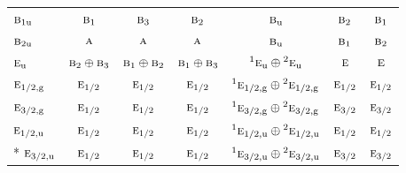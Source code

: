 \documentclass[10pt,a4paper]{article}
\numberwithin{equation}{section}
\newcommand{\irr}[1]{\text{\normalfont\scshape #1}}
\newcommand{\conjpair}[1]{{}^{#1}}
\newcommand{\ptag}[1]{\mathrm{#1}}
\begin{document}
{\begin{longtable}{@{}lcccccc@{}}
$\irr{b}_{1\ptag{u}}$ & $\irr{b}_{1}$ & $\irr{b}_{3}$ & $\irr{b}_{2}$ & $\irr{b}_{\ptag{u}}$ & $\irr{b}_{2}$ & $\irr{b}_{1}$\\
$\irr{b}_{2\ptag{u}}$ & $\irr{a}$ & $\irr{a}$ & $\irr{a}$ & $\irr{b}_{\ptag{u}}$ & $\irr{b}_{1}$ & $\irr{b}_{2}$\\
$\irr{e}_{\ptag{u}}$ & $\irr{b}_{2}\oplus \irr{b}_{3}$ & $\irr{b}_{1}\oplus \irr{b}_{2}$ & $\irr{b}_{1}\oplus \irr{b}_{3}$ & $\conjpair{1}\irr{e}_{\ptag{u}}\oplus \conjpair{2}\irr{e}_{\ptag{u}}$ & $\irr{e}$ & $\irr{e}$\\
$\irr{e}_{1/2,\ptag{g}}$ & $\irr{e}_{1/2}$ & $\irr{e}_{1/2}$ & $\irr{e}_{1/2}$ & $\conjpair{1}\irr{e}_{1/2,\ptag{g}}\oplus \conjpair{2}\irr{e}_{1/2,\ptag{g}}$ & $\irr{e}_{1/2}$ & $\irr{e}_{1/2}$\\
$\irr{e}_{3/2,\ptag{g}}$ & $\irr{e}_{1/2}$ & $\irr{e}_{1/2}$ & $\irr{e}_{1/2}$ & $\conjpair{1}\irr{e}_{3/2,\ptag{g}}\oplus \conjpair{2}\irr{e}_{3/2,\ptag{g}}$ & $\irr{e}_{3/2}$ & $\irr{e}_{3/2}$\\
$\irr{e}_{1/2,\ptag{u}}$ & $\irr{e}_{1/2}$ & $\irr{e}_{1/2}$ & $\irr{e}_{1/2}$ & $\conjpair{1}\irr{e}_{1/2,\ptag{u}}\oplus \conjpair{2}\irr{e}_{1/2,\ptag{u}}$ & $\irr{e}_{1/2}$ & $\irr{e}_{1/2}$\\*
$\irr{e}_{3/2,\ptag{u}}$ & $\irr{e}_{1/2}$ & $\irr{e}_{1/2}$ & $\irr{e}_{1/2}$ & $\conjpair{1}\irr{e}_{3/2,\ptag{u}}\oplus \conjpair{2}\irr{e}_{3/2,\ptag{u}}$ & $\irr{e}_{3/2}$ & $\irr{e}_{3/2}$\\
\bottomrule\end{longtable}}
\end{document}
